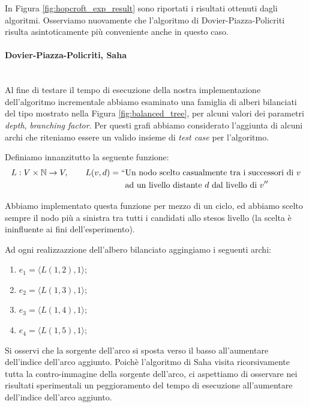 In Figura \ref{fig:hopcroft_exp_result} sono riportati i risultati ottenuti dagli algoritmi. Osserviamo nuovamente che l'algoritmo di Dovier-Piazza-Policriti risulta asintoticamente più conveniente anche in questo caso.

\paragraph{Dovier-Piazza-Policriti, Saha}\mbox{}\\

Al fine di testare il tempo di esecuzione della nostra implementazione dell'algoritmo incrementale abbiamo esaminato una famiglia di alberi bilanciati del tipo mostrato nella Figura \ref{fig:balanced_tree}, per alcuni valori dei parametri \emph{depth}, \emph{branching factor}. Per questi grafi abbiamo considerato l'aggiunta di alcuni archi che riteniamo essere un valido insieme di \emph{test case} per l'algoritmo.

Definiamo innanzitutto la seguente funzione:
\begin{align*}
    L: V \times \mathbb{N} \to V, \qquad L(v, d) = ``&\text{Un nodo scelto casualmente tra i successori di $v$}\\
    &\text{ad un livello distante $d$ dal livello di $v$}''
\end{align*}

Abbiamo implementato questa funzione per mezzo di un ciclo, ed abbiamo scelto sempre il nodo più a sinistra tra tutti i candidati allo stesos livello (la scelta è ininfluente ai fini dell'esperimento).

Ad ogni realizzazzione dell'albero bilanciato aggingiamo i seguenti archi:
\begin{enumerate}
    \item $e_1 = \langle L(1, 2), 1 \rangle$;
    \item $e_2 = \langle L(1, 3), 1 \rangle$;
    \item $e_3 = \langle L(1, 4), 1 \rangle$;
    \item $e_4 = \langle L(1, 5), 1 \rangle$;
\end{enumerate}

Si osservi che la sorgente dell'arco si sposta verso il basso all'aumentare dell'indice dell'arco aggiunto. Poichè l'algoritmo di Saha visita ricorsivamente tutta la contro-immagine della sorgente dell'arco, ci aspettiamo di osservare nei risultati sperimentali un peggioramento del tempo di esecuzione all'aumentare dell'indice dell'arco aggiunto.

